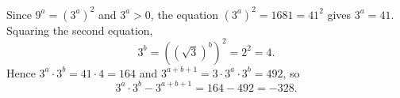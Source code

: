 Since $9^a=\left(3^a\right)^2$ and $3^a>0$, the equation $\left(3^a\right)^2=1681=41^2$ gives $3^a=41$. Squaring the second equation,
\[3^b=\left(\left(\sqrt3\right)^b\right)^2=2^2=4.\]
Hence $3^a\cdot3^b=41\cdot4=164$ and $3^{a+b+1}=3\cdot3^a\cdot3^b=492$, so
\[3^a\cdot3^b-3^{a+b+1}=164-492=\boxed{-328}.\]
